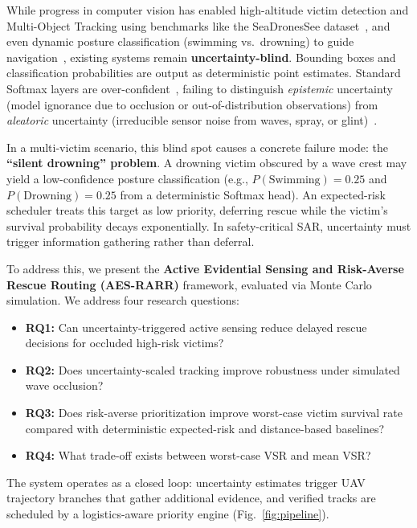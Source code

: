 \documentclass[11pt,a4paper]{article}
\begin{document}
While progress in computer vision has enabled high-altitude victim detection
and Multi-Object Tracking using benchmarks like the SeaDronesSee
dataset~\cite{ref3}, and even dynamic posture classification (swimming
vs.\ drowning) to guide navigation~\cite{ref4}, existing systems remain
\textbf{uncertainty-blind}.
Bounding boxes and classification probabilities are output as deterministic
point estimates.
Standard Softmax layers are over-confident~\cite{guo2017}, failing to
distinguish \emph{epistemic} uncertainty (model ignorance due to occlusion
or out-of-distribution observations) from \emph{aleatoric} uncertainty
(irreducible sensor noise from waves, spray, or glint)~\cite{kendall2017}.

In a multi-victim scenario, this blind spot causes a concrete failure mode: the
\textbf{``silent drowning'' problem}.
A drowning victim obscured by a wave crest may yield a low-confidence
posture classification (e.g., $P(\text{Swimming}) = 0.25$ and $P(\text{Drowning}) = 0.25$ from a deterministic Softmax head).
An expected-risk scheduler treats this target as low priority, deferring
rescue while the victim's survival probability decays exponentially.
In safety-critical SAR, uncertainty must trigger information gathering rather than deferral.

To address this, we present the
\textbf{Active Evidential Sensing and Risk-Averse Rescue Routing (AES-RARR)}
framework, evaluated via Monte Carlo simulation.
We address four research questions:

\begin{itemize}
  \item \textbf{RQ1:} Can uncertainty-triggered active sensing reduce delayed rescue decisions for occluded high-risk victims?
  \item \textbf{RQ2:} Does uncertainty-scaled tracking improve robustness under simulated wave occlusion?
  \item \textbf{RQ3:} Does risk-averse prioritization improve worst-case victim survival rate compared with deterministic expected-risk and distance-based baselines?
  \item \textbf{RQ4:} What trade-off exists between worst-case VSR and mean VSR?
\end{itemize}

The system operates as a closed loop:
uncertainty estimates trigger UAV trajectory branches that gather additional
evidence, and verified tracks are scheduled by a logistics-aware priority engine
(Fig.~\ref{fig:pipeline}).
\end{document}
